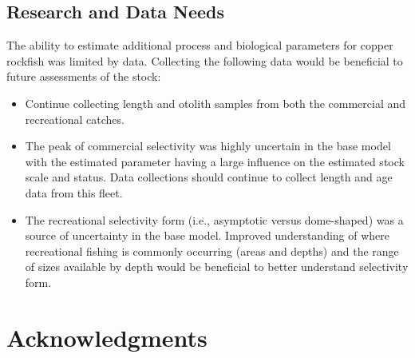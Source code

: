 \documentclass[11pt,
  english,
  a4paper,
]{article}
\begin{document}
\leavevmode\tagmcend\tagstructend\par


\hypertarget{research-and-data-needs}{%
\subsection{Research and Data Needs}\label{research-and-data-needs}}

\leavevmode\tagmcend\tagstructend


The ability to estimate additional process and biological parameters for copper rockfish was limited by data. Collecting the following data would be beneficial to future assessments of the stock:

\leavevmode\tagmcend\tagstructend\par

\begin{itemize}

    \item Continue collecting length and otolith samples from both the commercial and recreational catches. 

    \item The peak of commercial selectivity was highly uncertain in the base model with the estimated parameter having a large influence on the estimated stock scale and status. Data collections should continue to collect length and age data from this fleet. 

    \item The recreational selectivity form (i.e., asymptotic versus dome-shaped) was a source of uncertainty in the base model. Improved understanding of where recreational fishing is commonly occurring (areas and depths) and the range of sizes available by depth would be beneficial to better understand selectivity form.  

\end{itemize}


\hypertarget{acknowledgments}{%
\section{Acknowledgments}\label{acknowledgments}}

\leavevmode\tagmcend\tagstructend

\end{document}
